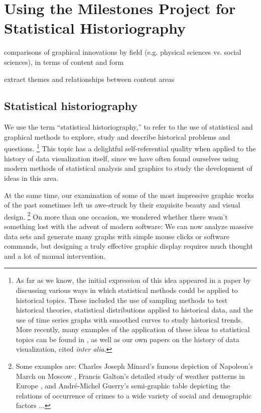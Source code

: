 \documentclass[11pt]{article}
\begin{document}
\section{Using the Milestones Project for Statistical Historiography}\label{sec:historiography}
\begin{itemize*}
  \item comparisons of graphical innovations by field (e.g. physical sciences vs. social sciences), in terms of content and form
  \item extract themes and relationships between content areas
\end{itemize*}

\subsection{Statistical historiography}
We use the term ``statistical historiography,''
to refer to the use of statistical and graphical methods to
explore, study and describe historical problems and questions.%
\footnote{As far as we know, the initial expression of this idea appeared in a paper by
\citet{Rubin:1943} discussing various ways in which statistical methods could be applied
to historical topics.  These included the use of sampling methods to test historical theories,
statistical distributions applied to historical data, and the use of
time series graphs with smoothed curves to study historical trends.
More recently, many examples of the application of these ideas to statistical topics
can be found in \citet{Stigler:1986,Stigler:1999}, as well as our own papers
on the history of data visualization,
cited \emph{inter alia}.
}
This topic has a delightful self-referential quality when applied to the history of data visualization itself,
since we have often found ourselves using modern methods of statistical analysis and graphics to study
the development of ideas in this area.

At the same time, our examination of some of the most
impressive graphic works of the past sometimes left us awe-struck by their exquisite
beauty and visual design.%
\footnote{ Some examples are:
Charles Joseph Minard's famous depiction of Napoleon's March on Moscow \citep{Friendly:02:Minard},
Francis Galton's detailed study of weather patterns in Europe \citep[see:][]{Friendly:2008:golden},
and Andr{\'e}-Michel Guerry's \citep[Plate 17]{Guerry:1864}
semi-graphic table depicting the relations of occurrence of
crimes to a wide variety of social and demographic factors \citep[see:][]{Friendly:2007:guerry}
...
}
On more than one occasion, we wondered whether there wasn't something lost with the advent of modern
software: We can now analyze massive data sets and generate many graphs with simple mouse clicks
or software commands, but designing a truly effective graphic display requires much thought and
a lot of manual intervention.
\end{document}
